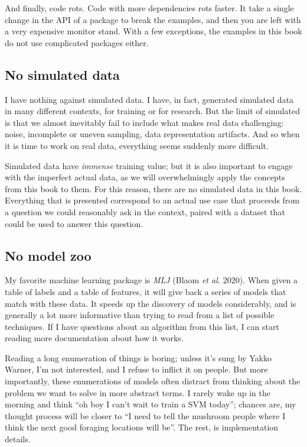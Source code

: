 \documentclass[
  letterpaper,
]{scrbook}
\begin{document}
And finally, code rots. Code with more dependencies rots faster. It take
a single change in the API of a package to break the examples, and then
you are left with a very expensive monitor stand. With a few exceptions,
the examples in this book do not use complicated packages either.

\subsection{No simulated data}\label{no-simulated-data}

I have nothing against simulated data. I have, in fact, generated
simulated data in many different contexts, for training or for research.
But the limit of simulated is that we almost inevitably fail to include
what makes real data challenging: noise, incomplete or uneven sampling,
data representation artifacts. And so when it is time to work on real
data, everything seems suddenly more difficult.

Simulated data have \emph{immense} training value; but it is also
important to engage with the imperfect actual data, as we will
overwhelmingly apply the concepts from this book to them. For this
reason, there are no simulated data in this book. Everything that is
presented correspond to an actual use case that proceeds from a question
we could reasonably ask in the context, paired with a dataset that could
be used to answer this question.

\subsection{No model zoo}\label{no-model-zoo}

My favorite machine learning package is \emph{MLJ} (Blaom \emph{et al.}
2020). When given a table of labels and a table of features, it will
give back a series of models that match with these data. It speeds up
the discovery of models considerably, and is generally a lot more
informative than trying to read from a list of possible techniques. If I
have questions about an algorithm from this list, I can start reading
more documentation about how it works.

Reading a long enumeration of things is boring; unless it's sung by
Yakko Warner, I'm not interested, and I refuse to inflict it on people.
But more importantly, these enumerations of models often distract from
thinking about the problem we want to solve in more abstract terms. I
rarely wake up in the morning and think ``oh boy I can't wait to train a
SVM today''; chances are, my thought process will be closer to ``I need
to tell the mushroom people where I think the next good foraging
locations will be''. The rest, is implementation details.
\end{document}

